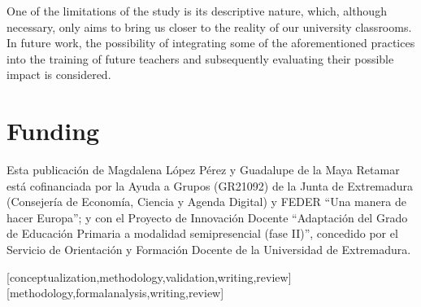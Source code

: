 \documentclass[english]{textolivre}
\begin{document}
One of the limitations of the study is its descriptive nature, which, although necessary, only aims to bring us closer to the reality of our university classrooms. In future work, the possibility of integrating some of the aforementioned practices into the training of future teachers and subsequently evaluating their possible impact is considered.

\section{Funding}
Esta publicación de Magdalena López Pérez y Guadalupe de la Maya Retamar está cofinanciada por la Ayuda a Grupos (GR21092) de la Junta de Extremadura (Consejería de Economía, Ciencia y Agenda Digital) y FEDER “Una manera de hacer Europa”; y con el Proyecto de Innovación Docente “Adaptación del Grado de Educación Primaria a modalidad semipresencial (fase II)”, concedido por el Servicio de Orientación y Formación Docente de la Universidad de Extremadura.


\printbibliography\label{sec-bib}


\begin{contributors}
[conceptualization,methodology,validation,writing,review]
[methodology,formalanalysis,writing,review]
\end{contributors}
\end{document}
